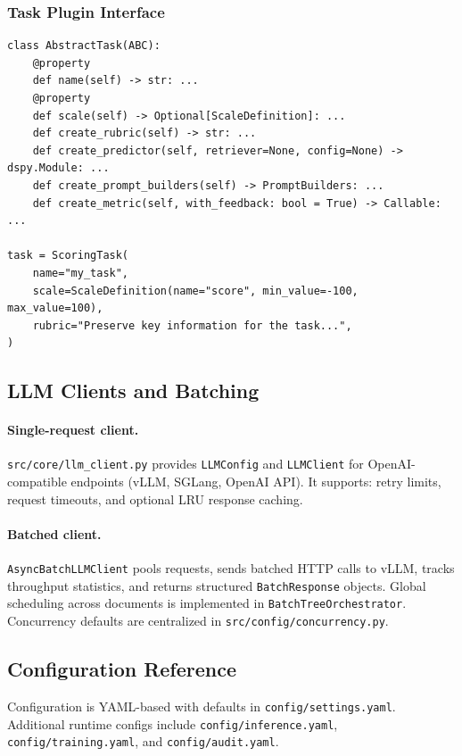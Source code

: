 \subsubsection{Task Plugin Interface}

\begin{lstlisting}
class AbstractTask(ABC):
    @property
    def name(self) -> str: ...
    @property
    def scale(self) -> Optional[ScaleDefinition]: ...
    def create_rubric(self) -> str: ...
    def create_predictor(self, retriever=None, config=None) -> dspy.Module: ...
    def create_prompt_builders(self) -> PromptBuilders: ...
    def create_metric(self, with_feedback: bool = True) -> Callable: ...

task = ScoringTask(
    name="my_task",
    scale=ScaleDefinition(name="score", min_value=-100, max_value=100),
    rubric="Preserve key information for the task...",
)
\end{lstlisting}

\subsection{LLM Clients and Batching}

\paragraph{Single-request client.}
\texttt{src/core/llm\_client.py} provides \texttt{LLMConfig} and \texttt{LLMClient}
for OpenAI-compatible endpoints (vLLM, SGLang, OpenAI API). It supports:
retry limits, request timeouts, and optional LRU response caching.

\paragraph{Batched client.}
\texttt{AsyncBatchLLMClient} pools requests, sends batched HTTP calls to vLLM,
tracks throughput statistics, and returns structured \texttt{BatchResponse} objects.
Global scheduling across documents is implemented in \texttt{BatchTreeOrchestrator}.
Concurrency defaults are centralized in \texttt{src/config/concurrency.py}.

\subsection{Configuration Reference}

Configuration is YAML-based with defaults in \texttt{config/settings.yaml}.
Additional runtime configs include \texttt{config/inference.yaml},
\texttt{config/training.yaml}, and \texttt{config/audit.yaml}.

